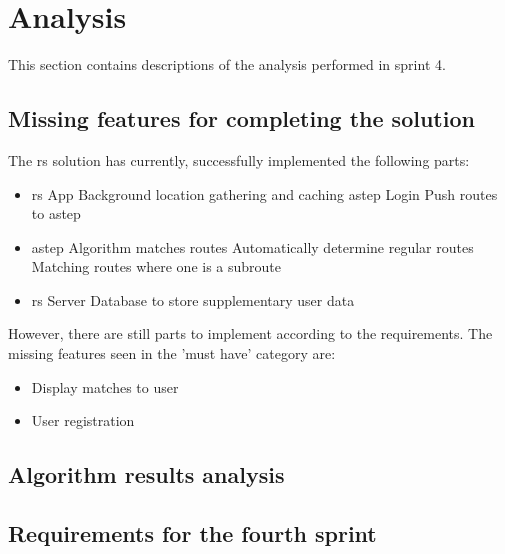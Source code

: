 \section{Analysis}
This section contains descriptions of the analysis performed in sprint 4.

\subsection{Missing features for completing the solution}
The \gls{rs} solution has currently, successfully implemented the following parts:
\begin{itemize}
	\item \gls{rs} App
	\subitem Background location gathering and caching
	\subitem \gls{astep} Login
	\subitem Push routes to \gls{astep}
	\item \gls{astep}
	\subitem Algorithm matches routes
	\subitem Automatically determine regular routes
	\subitem Matching routes where one is a subroute
	\item \gls{rs} Server
	\subitem Database to store supplementary user data
\end{itemize} 

However, there are still parts to implement according to the requirements.
The missing features seen in the 'must have' category are:
\begin{itemize}
	\item Display matches to user
	\item User registration
\end{itemize}


\subsection{Algorithm results analysis}


\subsection{Requirements for the fourth sprint}
